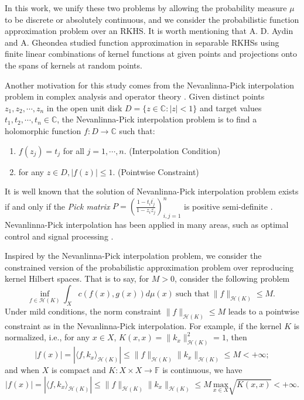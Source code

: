 \documentclass{amsart}
\numberwithin{equation}{section}
\theoremstyle{plain}
\theoremstyle{remark}
\theoremstyle{definition}
\begin{document}
In this work, we unify these two problems by allowing the probability measure $\mu$ to be discrete or absolutely continuous, and we consider the probabilistic function approximation problem over an RKHS. It is worth mentioning that A. D. Aydin and A. Gheondea \cite{aydin2021probability} studied function approximation in separable RKHSs using finite linear combinations of kernel functions at given points and projections onto the spans of kernels at random points.




Another motivation for this study comes from the Nevanlinna-Pick interpolation problem in complex analysis and operator theory \cite{agler2023pick, nevanlinna1919uber, pick1915beschrankungen}. Given distinct points \( z_1, z_2, \cdots, z_n \) in the open unit disk \(D = \{ z \in \mathbb{C}: |z| < 1 \}\) and target values \( t_1, t_2, \cdots, t_n \in \mathbb{C} \), the Nevanlinna-Pick interpolation problem is to find a holomorphic function \( f: D \to \mathbb{C} \) such that:
\begin{enumerate}
    \item[$(a)$] \( f(z_j) = t_j \) for all $j = 1, \cdots, n$. (Interpolation Condition)
    \item[$(b)$] for any $z \in D,  | f(z) | \leq 1$. (Pointwise Constraint)
\end{enumerate}
It is well known that the solution of Nevanlinna-Pick interpolation problem exists if and only if the \emph{Pick matrix} \( P = (\frac{1 - t_i \overline{t_j}}{1 - z_i \overline{z_j}} )_{i,j=1}^n \) is positive semi-definite \cite{pick1915beschrankungen}. Nevanlinna-Pick interpolation has been applied in many areas, such as optimal control \cite{francis1987course, tannenbaum1982modified} and signal processing \cite{blomqvist2003matrix}. 


Inspired by the Nevanlinna-Pick interpolation problem, we consider the constrained version of the probabilistic approximation problem over reproducing kernel Hilbert spaces.
That is to say, for $M>0$,  consider the following problem
\begin{equation}\label{normConstraint}
    \underset{f \in \mathscr{H}(K)}{\text{inf}} \ \int_{X} c(f(x),g(x))  d\mu(x) \  \text{such that} \ \|f\|_{\mathscr{H}(K)} \leq M.
\end{equation}
Under mild conditions, the norm constraint $\| f \|_{\mathscr{H}(K)} \leq M$  leads to a pointwise constraint as in the Nevanlinna-Pick interpolation. For example, if the kernel $K$ is normalized, i.e., for any $x \in X$, $K(x, x)=\|k_x\|_{\mathscr{H}(K)}^2 =1$, then  
$$|f(x)| = |\langle f, k_x \rangle_{\mathscr{H}(K)}| \leq \| f \|_{\mathscr{H}(K)} \|k_x\|_{\mathscr{H}(K)} \leq M < +\infty;$$
and when $X$ is compact and $K: X \times X \rightarrow \mathbb{F}$ is continuous, we have
$$|f(x)| = |\langle f, k_x \rangle_{\mathscr{H}(K)}| \leq \| f \|_{\mathscr{H}(K)} \|k_x\|_{\mathscr{H}(K)} \leq M \ \underset{x \in X}{\text{max}} \sqrt{K(x, x)} < +\infty.$$
\end{document}
